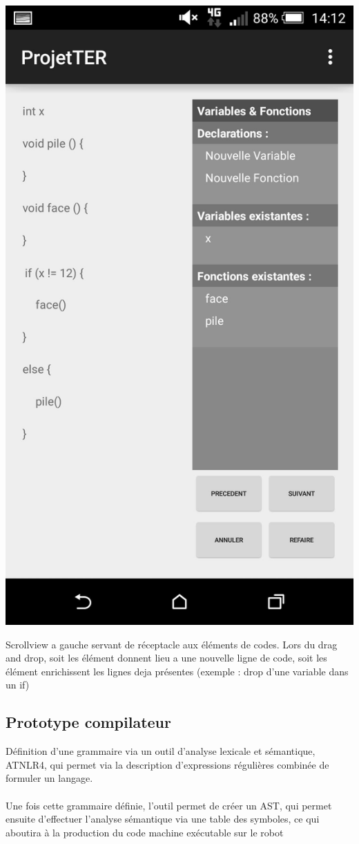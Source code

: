 \documentclass[a4paper]{article}
\begin{document}
\begin{center}
\includegraphics[scale=0.1]{img/create3.jpg}
\end{center}

Scrollview a gauche servant de réceptacle aux éléments de codes. Lors du drag and drop, soit les élément donnent lieu a une nouvelle ligne de code, soit les élément enrichissent les lignes deja présentes (exemple : drop d’une variable dans un if)

\subsection{Prototype compilateur}
Définition d’une grammaire via un outil d’analyse lexicale et sémantique, ATNLR4, qui permet via la description d’expressions régulières combinée de formuler un langage.\\
\\
Une fois cette grammaire définie, l’outil permet de créer un AST, qui permet ensuite d’effectuer l’analyse sémantique via une table des symboles, ce qui aboutira à la production du code machine exécutable sur le robot
\end{document}
